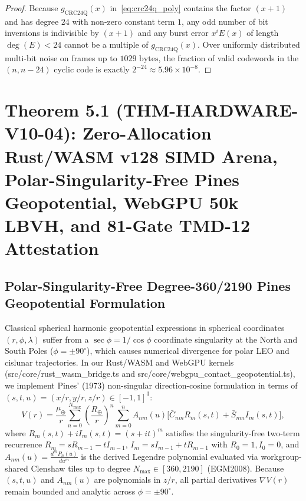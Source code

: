 \documentclass[11pt,a4paper,reqno]{article}
\def\bm#1{#1}%
\def\texttt#1{#1}%
\theoremstyle{plain}
\theoremstyle{definition}
\theoremstyle{remark}
\numberwithin{equation}{section}
\begin{document}
\begin{proof}
Because $g_{\text{CRC24Q}}(x)$ in~\eqref{eq:crc24q_poly} contains the factor $(x + 1)$ and has degree $24$ with non-zero constant term $1$, any odd number of bit inversions is indivisible by $(x+1)$ and any burst error $x^i E(x)$ of length $\deg(E) < 24$ cannot be a multiple of $g_{\text{CRC24Q}}(x)$. Over uniformly distributed multi-bit noise on frames up to $1029\text{ bytes}$, the fraction of valid codewords in the $(n, n-24)$ cyclic code is exactly $2^{-24} \approx 5.96 \times 10^{-8}$.
\end{proof}

\section{\texorpdfstring{Theorem 5.1 (\texttt{THM-HARDWARE-V10-04}): Zero-Allocation Rust/WASM \texttt{v128} SIMD Arena, Polar-Singularity-Free Pines Geopotential, WebGPU 50k LBVH, and 81-Gate TMD-12 Attestation}{Theorem 5.1 (THM-HARDWARE-V10-04): Zero-Allocation Rust/WASM v128 SIMD Arena, Polar-Singularity-Free Pines Geopotential, WebGPU 50k LBVH, and 81-Gate TMD-12 Attestation}}

\subsection{Polar-Singularity-Free Degree-360/2190 Pines Geopotential Formulation}
Classical spherical harmonic geopotential expressions in spherical coordinates $(r, \phi, \lambda)$ suffer from a $\sec\phi = 1/\cos\phi$ coordinate singularity at the North and South Poles ($\phi = \pm 90^\circ$), which causes numerical divergence for polar LEO and cislunar trajectories. In our Rust/WASM and WebGPU kernels (\texttt{src/core/rust\_wasm\_bridge.ts} and \texttt{src/core/webgpu\_contact\_geopotential.ts}), we implement Pines' (1973) non-singular direction-cosine formulation in terms of $(s, t, u) = (x/r, y/r, z/r) \in [-1, 1]^3$:
\begin{equation}
  V(\bm{r}) = \frac{\mu_\oplus}{r}\sum_{n=0}^{N_{\max}}\left(\frac{R_\oplus}{r}\right)^{\!n} \sum_{m=0}^{n} A_{nm}(u)\Big[\bar{C}_{nm} R_m(s,t) + \bar{S}_{nm} I_m(s,t)\Big],
  \label{eq:pines_potential}
\end{equation}
where $R_m(s,t) + i I_m(s,t) = (s + it)^m$ satisfies the singularity-free two-term recurrence $R_m = s R_{m-1} - t I_{m-1}$, $I_m = s I_{m-1} + t R_{m-1}$ with $R_0 = 1, I_0 = 0$, and $A_{nm}(u) = \frac{d^m P_n(u)}{du^m}$ is the derived Legendre polynomial evaluated via workgroup-shared Clenshaw tiles up to degree $N_{\max} \in [360, 2190]$ (EGM2008). Because $(s, t, u)$ and $A_{nm}(u)$ are polynomials in $z/r$, all partial derivatives $\nabla V(\bm{r})$ remain bounded and analytic across $\phi = \pm 90^\circ$.
\end{document}
